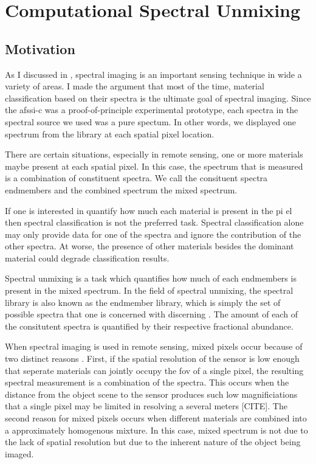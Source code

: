 \chapter{Computational Spectral Unmixing}\label{chap:Csu}

\section{Motivation}

As I discussed in , spectral imaging is an important sensing technique in wide a variety of areas. I made the argument that most of the time, material classification based on their spectra is the ultimate goal of spectral imaging. Since the \gls{afssi-c} was a proof-of-principle experimental prototype, each spectra in the spectral source we used was a pure spectum. In other words, we displayed one spectrum from the library at each spatial pixel location. 

There are certain situations, especially in remote sensing, one or more materials maybe present at each spatial pixel. In this case, the spectrum that is measured is a combination of constituent spectra. We call the consituent spectra \glspl{endmember} and the combined spectrum the \gls{mixed spectrum}.

If one is interested in quantify how much each material is present in the pi el then spectral classification is not the preferred task. Spectral classification alone may only provide data for one of the spectra and ignore the contribution of the other spectra. At worse, the presence of other materials besides the dominant material could degrade classification results. 

Spectral unmixing is a task which quantifies how much of each \glspl{endmember} is present in the \gls{mixed spectrum}. In the field of spectral unmixing, the spectral library is also known as the endmember library, which is simply the set of possible spectra that one is concerned with discerning \cite{lillesand2014remote}. The amount of each of the consitutent spectra is quantified by their respective \gls{fractional abundance}.

When spectral imaging is used in remote sensing, mixed pixels occur because of two distinct reasons \cite{keshava2002spectral, keshava2003survey}. First, if the spatial resolution of the sensor is low enough that seperate materials can jointly occupy the \acrfull{fov} of a single pixel, the resulting spectral measurement is a combination of the spectra. This occurs when the distance from the object scene to the sensor produces such low magnificiations that a single pixel may be limited in resolving a several meters [CITE]. The second reason for mixed pixels occurs when different materials are combined into a approximately homogenous mixture. In this case, mixed spectrum is not due to the lack of spatial resolution but due to the inherent nature of the object being imaged.

